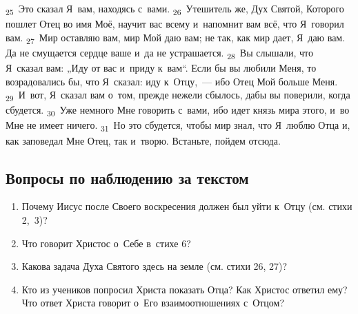 \documentclass[a4paper,12pt]{article}
\begin{document}
\textsubscript{25}~Это сказал Я~вам, находясь с~вами.
\textsubscript{26}~Утешитель же, Дух Святой, Которого пошлет Отец во имя Моё, научит вас всему и~напомнит вам всё, что Я~говорил вам.
\textsubscript{27}~Мир оставляю вам, мир Мой даю вам; не так, как мир дает, Я~даю вам. Да не смущается сердце ваше и~да не устрашается.
\textsubscript{28}~Вы слышали, что Я~сказал вам: „Иду от вас и~приду к~вам“. Если бы вы любили Меня, то возрадовались бы, что Я~сказал: иду к~Отцу,~--- ибо Отец Мой больше Меня.
\textsubscript{29}~И~вот, Я~сказал вам о~том, прежде нежели сбылось, дабы вы поверили, когда сбудется.
\textsubscript{30}~Уже немного Мне говорить с~вами, ибо идет князь мира этого, и~во Мне не имеет ничего.
\textsubscript{31}~Но это сбудется, чтобы мир знал, что Я~люблю Отца и, как заповедал Мне Отец, так и~творю. Встаньте, пойдем отсюда. 

\subsection*{Вопросы по наблюдению за текстом}
\begin{enumerate}
    \item Почему Иисус после Своего воскресения должен был уйти к~Отцу (см. стихи 2,~3)? 
    
    \myline
    
    \myline
    \item Что говорит Христос о~Себе в~стихе 6? 
    
    \myline
    
    \myline
    \item Какова задача Духа Святого здесь на земле (см. стихи 26, 27)? 
    
    \myline
    
    \myline
    \item Кто из учеников попросил Христа показать Отца? Как Христос ответил ему? Что ответ Христа говорит о~Его взаимоотношениях с~Отцом? 
    
    \myline
    
    \myline
\end{enumerate}
\end{document}
